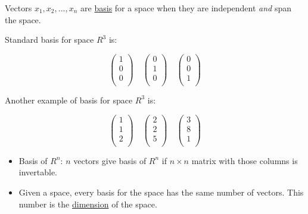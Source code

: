 \documentclass[12pt]{article}
\begin{document}
Vectors $x_1,x_2,...,x_n$ are \underline{basis} for a space when they are independent \textit{and} span the space.

Standard basis for space $R^3$ is:

\[
\left(
    \begin{matrix}
        1\\
        0\\
        0\\
    \end{matrix}
\right)
\quad
\left(
    \begin{matrix}
        0\\
        1\\
        0\\
    \end{matrix}
\right)
\quad
\left(
    \begin{matrix}
        0\\
        0\\
        1\\
    \end{matrix}
\right)
\]

Another example of basis for space $R^3$ is:

\[
\left(
    \begin{matrix}
        1\\
        1\\
        2\\
    \end{matrix}
\right)
\quad
\left(
    \begin{matrix}
        2\\
        2\\
        5\\
    \end{matrix}
\right)
\quad
\left(
    \begin{matrix}
        3\\
        8\\
        1\\
    \end{matrix}
\right)
\]

\begin{itemize}
    \item Basis of $R^n$: $n$ vectors give basis of $R^n$ if $n\times{n}$ matrix with those columns is invertable.
    \item Given a space, every basis for the space has the same number of vectors. This number is the \underline{dimension} of the space.
\end{itemize}
\end{document}
